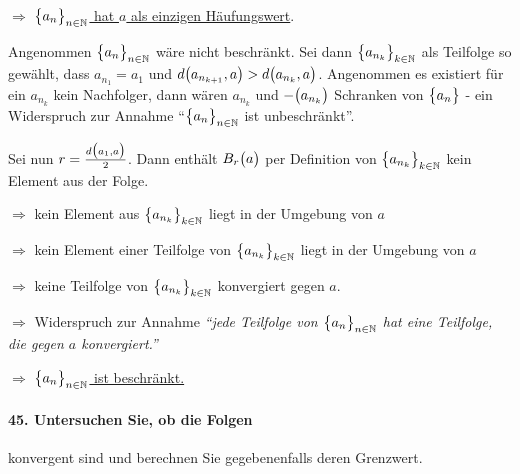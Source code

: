 \documentclass{scrreprt}
\begin{document}
\begin{itemize}
  $\Rightarrow$ \underline{$\qty\big{a_n}_{n \in \mathbb{N}}$ hat $a$ als
    einzigen Häufungswert}.

  Angenommen $\qty\big{a_n}_{n \in \mathbb{N}}$ wäre nicht beschränkt.
  Sei dann $\qty\big{a_{n_k}}_{k \in \mathbb{N}}$ als Teilfolge so gewählt,
  dass $a_{n_1} = a_1$ und $d\qty\big(a_{n_{k + 1}}, a) > d\qty\big(a_{n_k}, a)$.
  Angenommen es existiert für ein $a_{n_k}$ kein Nachfolger, dann wären $a_{n_k}$
  und $-\qty\big(a_{n_k})$ Schranken von $\qty\big{a_n}$ - ein Widerspruch zur
  Annahme ``$\qty\big{a_n}_{n \in \mathbb{N}}$ ist unbeschränkt''.

  Sei nun $r = \frac{d\qty\big(a_1, a)}{2}$.
  Dann enthält $B_r\qty\big(a)$ per Definition von
  $\qty\big{a_{n_k}}_{k \in \mathbb{N}}$ kein Element aus
  der Folge.

  $\Rightarrow$ kein Element aus $\qty\big{a_{n_k}}_{k \in \mathbb{N}}$ liegt
  in der Umgebung von $a$

  $\Rightarrow$ kein Element einer Teilfolge von
  $\qty\big{a_{n_k}}_{k \in \mathbb{N}}$ liegt in der Umgebung von $a$

  $\Rightarrow$ keine Teilfolge von $\qty\big{a_{n_k}}_{k \in \mathbb{N}}$
  konvergiert gegen $a$.

  $\Rightarrow$ Widerspruch zur Annahme \emph{``jede Teilfolge von
    $\qty\big{a_n}_{n \in \mathbb{N}}$ hat eine Teilfolge, die gegen $a$
    konvergiert.''}

  $\Rightarrow$ \underline{$\qty\big{a_n}_{n \in \mathbb{N}}$ ist beschränkt.}
\end{itemize}

\newpage
\paragraph{45. Untersuchen Sie, ob die Folgen} konvergent sind und berechnen
Sie gegebenenfalls deren Grenzwert.
\end{document}
